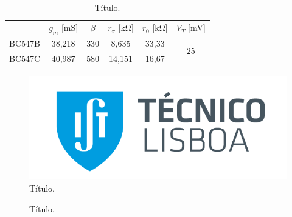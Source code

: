 \begin{table}[H]
    \caption{Título.}
    \label{tab:exemplo}
    \centering
    \begin{tabular}{c|c|c|c|c|c|}
    \cline{2-6}  
    & \cellcolor[HTML]{EFEFEF} $g_m$ [mS] & \cellcolor[HTML]{EFEFEF} $\beta$ & \cellcolor[HTML]{EFEFEF} $r_\pi$ [\si{\kilo\ohm}] & \cellcolor[HTML]{EFEFEF} $r_0$ [\si{\kilo\ohm}] & \cellcolor[HTML]{EFEFEF} $V_T$ [\si{\milli\volt}] \\ \cline{1-6} 
    \multicolumn{1}{|l|}{\cellcolor[HTML]{EFEFEF} BC547B} & 38,218 & 330 & 8,635 & 33,33 & \multirow{2}{*}{25} \\ \cline{1-5}
    \multicolumn{1}{|l|}{\cellcolor[HTML]{EFEFEF} BC547C} & 40,987 & 580 & 14,151 & 16,67 & \\ \hline
    \end{tabular}
\end{table}


\begin{figure}[H]
    \centering
    \includegraphics[scale = 0.6]{imagens/ist.png} 
    \caption{Título.}
    \label{fig:exemplo.1}
\end{figure}
\vspace*{-0.2cm}


\begin{figure}[H]
    \centering
    \qquad
    \caption{Título.}
    \label{fig:exemplo.2}
\end{figure}
\vspace*{-0.2cm}


